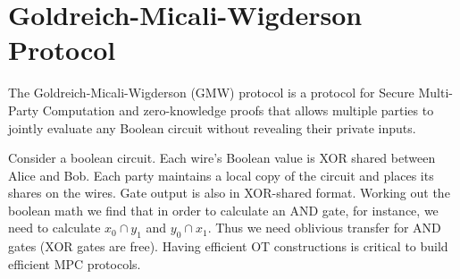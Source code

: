 \section{Goldreich-Micali-Wigderson Protocol}

The Goldreich-Micali-Wigderson (GMW) protocol
is a protocol for Secure Multi-Party Computation
and zero-knowledge proofs that allows multiple
parties to jointly evaluate any Boolean circuit
without revealing their private inputs.

Consider a boolean circuit. Each wire's Boolean value 
is XOR shared between Alice and Bob. 
Each party maintains a local copy of the circuit 
and places its shares on the wires. 
Gate output is also in XOR-shared format.
Working out the boolean math we find that 
in order to calculate an AND gate, for instance, 
we need to calculate $x_0 \cap y_1$ and $y_0 \cap x_1$. 
Thus we need oblivious transfer for AND gates (XOR
gates are free). Having efficient OT constructions 
is critical to build efficient MPC protocols.